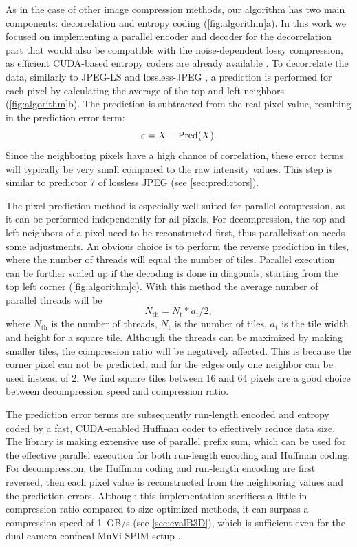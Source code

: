     As in the case of other image compression methods, our algorithm has two main components: decorrelation and entropy coding (\autoref{fig:algorithm}a). In this work we focused on implementing a parallel encoder and decoder for the decorrelation part that would also be compatible with the noise-dependent lossy compression, as efficient CUDA-based entropy coders are already available \cite{treib_interactive_2012}. To decorrelate the data, similarly to JPEG-LS and lossless-JPEG \cite{pennebaker_jpeg:_1992}, a prediction is performed for each pixel by calculating the average of the top and left neighbors (\autoref{fig:algorithm}b). The prediction is subtracted from the real pixel value, resulting in the prediction error term:
    \begin{equation}
      \varepsilon = X - \operatorname{Pred}(X).
    \end{equation}
    Since the neighboring pixels have a high chance of correlation, these error terms will typically be very small compared to the raw intensity values. This step is similar to predictor 7 of lossless JPEG (see \ref{sec:predictors}).

    The pixel prediction method is especially well suited for parallel compression, as it can be performed independently for all pixels. For decompression, the top and left neighbors of a pixel need to be reconstructed first, thus parallelization needs some adjustments. An obvious choice is to perform the reverse prediction in tiles, where the number of threads will equal the number of tiles. Parallel execution can be further scaled up if the decoding is done in diagonals, starting from the top left corner (\autoref{fig:algorithm}c). With this method the average number of parallel threads will be
    \begin{equation}
      N_\mathrm{th} = N_\mathrm{t} * a_\mathrm{t} / 2,
      \label{eq:numThreads}
    \end{equation}
    where $N_\mathrm{th}$ is the number of threads, $N_\mathrm{t}$ is the number of tiles, $a_\mathrm{t}$ is the tile width and height for a square tile. Although the threads can be maximized by making smaller tiles, the compression ratio will be negatively affected. This is because the corner pixel can not be predicted, and for the edges only one neighbor can be used instead of 2. We find square tiles between 16 and 64 pixels are a good choice between decompression speed and compression ratio.
    
    The prediction error terms are subsequently run-length encoded and entropy coded by a fast, CUDA-enabled Huffman coder \cite{treib_interactive_2012,treib_turbulence_2012} to effectively reduce data size. The library is making extensive use of parallel prefix sum, which can be used for the effective parallel execution for both run-length encoding and Huffman coding. For decompression, the Huffman coding and run-length encoding are first reversed, then each pixel value is reconstructed from the neighboring values and the prediction errors. Although this implementation sacrifices a little in compression ratio compared to size-optimized methods, it can surpass a compression speed of \SI{1}{GB/s} (see \autoref{sec:evalB3D}), which is sufficient even for the dual camera confocal MuVi-SPIM setup \cite{de_medeiros_confocal_2015}.
    
